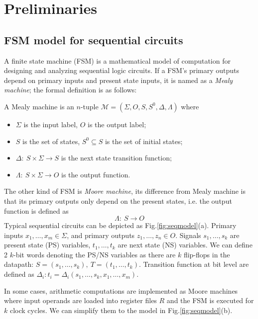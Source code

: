 %


\section{Preliminaries}

\subsection{FSM model for sequential circuits}
A finite state machine (FSM) is a mathematical model of computation for designing and analyzing sequential logic 
circuits. If a FSM's primary outputs depend on primary inputs and present state inputs, it is named as a \textit{Mealy machine};
the formal definition is as follows:
\begin{Definition}
A Mealy machine is an $n$-tuple $\mathcal M = (\Sigma,O,S,S^0,\Delta,\Lambda)$ where
\begin{itemize}
\item $\Sigma$ is the input label, $O$ is the output label;
\item $S$ is the set of states, $S^0\subseteq S$ is the set of initial states;
\item $\Delta:\ S\times\Sigma\to S$ is the next state transition function;
\item $\Lambda:\ S\times\Sigma\to O$ is the output function.
\end{itemize}
\end{Definition}
The other kind of FSM is \textit{Moore machine}, its difference from Mealy machine is that
its primary outputs only depend on the present states, i.e. the output function is defined as
$$\Lambda:\ S \to O$$
Typical sequential circuits can be depicted as Fig.\ref{fig:seqmodel}(a). Primary inputs
$x_1,\dots,x_m \in \Sigma$, and primary outputs $z_1,\dots,z_n\in O$. Signals $s_1,\dots,s_k$ 
are present state (PS) variables, $t_1,\dots,t_k$ are next state (NS) variables.
We can define 2 $k$-bit words denoting the PS/NS variables as there are $k$ flip-flops
in the datapath: $S = (s_1,\dots,s_k), ~T=(t_1,\dots,t_k)$. Transition function
at bit level are defined as $\Delta_i: t_i = \Delta_i(s_1,\dots,s_k,x_1,\dots,x_m)$.
\begin{figure}[hbt]
\end{figure}
In some cases, arithmetic computations are implemented as Moore machines where input operands
are loaded into register files $R$ and the FSM is executed for $k$ clock cycles.
We can simplify them to the model in Fig.\ref{fig:seqmodel}(b).

